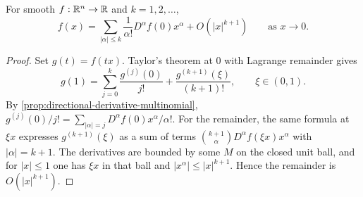 \begin{proposition}
\label{prop:taylor-multiindex}





For smooth $f : \mathbb{R}^n \to \mathbb{R}$ and $k=1,2,\ldots$,
\[
f(x)=\sum_{|\alpha|\leq k}\frac{1}{\alpha!}D^\alpha f(0)x^\alpha
+O(|x|^{k+1})\qquad\text{as }x\to0.
\]
\end{proposition}
\begin{proof}

\sketch
Set $g(t)=f(tx)$. Taylor's theorem at $0$ with Lagrange remainder gives
\[
g(1)=\sum_{j=0}^k\frac{g^{(j)}(0)}{j!}
 +\frac{g^{(k+1)}(\xi)}{(k+1)!},\qquad \xi\in(0,1).
\]
By \cref{prop:directional-derivative-multinomial},
$g^{(j)}(0)/j!=\sum_{|\alpha|=j}D^\alpha f(0)x^\alpha/\alpha!$.
For the remainder, the same formula at $\xi x$ expresses
$g^{(k+1)}(\xi)$ as a sum of terms
$\binom{k+1}{\alpha}D^\alpha f(\xi x)x^\alpha$ with $|\alpha|=k+1$.
The derivatives are bounded by some $M$ on the closed unit ball, and for
$|x|\leq1$ one has $\xi x$ in that ball and
$|x^\alpha|\leq|x|^{k+1}$. Hence the remainder is
$O(|x|^{k+1})$.
\end{proof}
